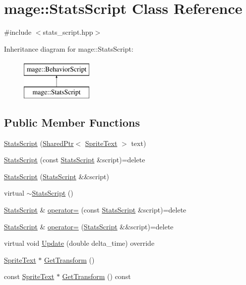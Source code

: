 \hypertarget{classmage_1_1_stats_script}{}\section{mage\+:\+:Stats\+Script Class Reference}
\label{classmage_1_1_stats_script}


{\ttfamily \#include $<$stats\+\_\+script.\+hpp$>$}

Inheritance diagram for mage\+:\+:Stats\+Script\+:\begin{figure}[H]
\begin{center}
\leavevmode
\includegraphics[height=2.000000cm]{classmage_1_1_stats_script}
\end{center}
\end{figure}
\subsection*{Public Member Functions}
\begin{DoxyCompactItemize}
\item 
\hyperlink{classmage_1_1_stats_script_a5d2042950a17b62004adead100eb07e1}{Stats\+Script} (\hyperlink{namespacemage_a1e01ae66713838a7a67d30e44c67703e}{Shared\+Ptr}$<$ \hyperlink{classmage_1_1_sprite_text}{Sprite\+Text} $>$ text)
\item 
\hyperlink{classmage_1_1_stats_script_aab237b7c391d7ca7ad96cfa33a3aac81}{Stats\+Script} (const \hyperlink{classmage_1_1_stats_script}{Stats\+Script} \&script)=delete
\item 
\hyperlink{classmage_1_1_stats_script_af511d7e2e6bec30cd05782de94c65abe}{Stats\+Script} (\hyperlink{classmage_1_1_stats_script}{Stats\+Script} \&\&script)
\item 
virtual \hyperlink{classmage_1_1_stats_script_a65ba91e19c78c99831a65ad6dd6bb149}{$\sim$\+Stats\+Script} ()
\item 
\hyperlink{classmage_1_1_stats_script}{Stats\+Script} \& \hyperlink{classmage_1_1_stats_script_a7da39f1c0cc417dabdc539f49deec7c3}{operator=} (const \hyperlink{classmage_1_1_stats_script}{Stats\+Script} \&script)=delete
\item 
\hyperlink{classmage_1_1_stats_script}{Stats\+Script} \& \hyperlink{classmage_1_1_stats_script_a6adacd651debb83254e1121f32c8f21e}{operator=} (\hyperlink{classmage_1_1_stats_script}{Stats\+Script} \&\&script)=delete
\item 
virtual void \hyperlink{classmage_1_1_stats_script_abb2f4de15b51b72e54dc893ecd947fad}{Update} (double delta\+\_\+time) override
\item 
\hyperlink{classmage_1_1_sprite_text}{Sprite\+Text} $\ast$ \hyperlink{classmage_1_1_stats_script_ac3fdf01da2b0ace8afd2c52284c34eef}{Get\+Transform} ()
\item 
const \hyperlink{classmage_1_1_sprite_text}{Sprite\+Text} $\ast$ \hyperlink{classmage_1_1_stats_script_a33bbbe0f85058b706848223a6180da3d}{Get\+Transform} () const
\end{DoxyCompactItemize}
